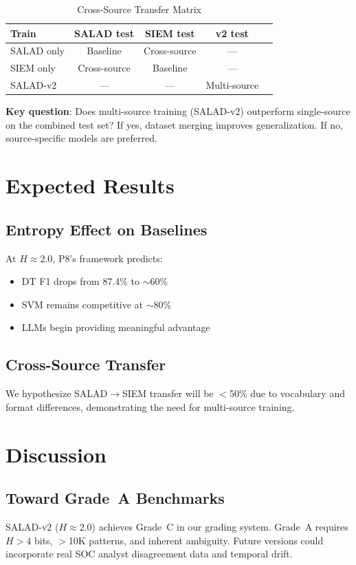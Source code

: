 \documentclass[journal]{IEEEtran}
\begin{document}
\begin{table}[!ht]
\centering\caption{Cross-Source Transfer Matrix}
\begin{tabular}{lcccc}
\toprule
\textbf{Train} & \textbf{SALAD test} & \textbf{SIEM test} & \textbf{v2 test} \\
\midrule
SALAD only & Baseline & Cross-source & --- \\
SIEM only & Cross-source & Baseline & --- \\
SALAD-v2 & --- & --- & Multi-source \\
\bottomrule
\end{tabular}
\end{table}

\textbf{Key question}: Does multi-source training (SALAD-v2) outperform single-source on the combined test set? If yes, dataset merging improves generalization. If no, source-specific models are preferred.

\section{Expected Results}

\subsection{Entropy Effect on Baselines}
At $H\approx2.0$, P8's framework predicts:
\begin{itemize}
\item DT F1 drops from 87.4\% to $\sim$60\%
\item SVM remains competitive at $\sim$80\%
\item LLMs begin providing meaningful advantage
\end{itemize}

\subsection{Cross-Source Transfer}
We hypothesize SALAD$\to$SIEM transfer will be $<$50\% due to vocabulary and format differences, demonstrating the need for multi-source training.

\section{Discussion}

\subsection{Toward Grade~A Benchmarks}
SALAD-v2 ($H\approx2.0$) achieves Grade~C in our grading system. Grade~A requires $H>4$ bits, $>$10K patterns, and inherent ambiguity. Future versions could incorporate real SOC analyst disagreement data and temporal drift.
\end{document}
